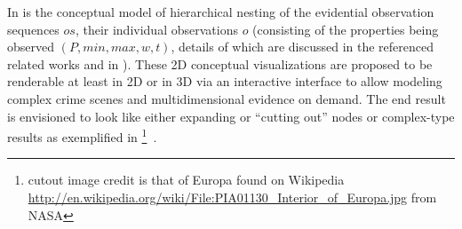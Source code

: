 
In  is the
conceptual model of hierarchical nesting of the evidential
observation sequences $os$, their individual observations $o$ (consisting
of the properties being observed $(P,min,max,w,t)$, details of which are discussed
in the referenced related works and in \cite[Chapter 7]{mokhov-phd-thesis-2013}).
%
These 2D conceptual visualizations are proposed
to be renderable at least in 2D or in 3D via an interactive interface to allow modeling complex
crime scenes and multidimensional evidence on demand. The end result is envisioned to look like
either expanding or ``cutting out'' nodes or complex-type results as
exemplified in \footnote{cutout image credit is that of Europa found on Wikipedia
\url{http://en.wikipedia.org/wiki/File:PIA01130_Interior_of_Europa.jpg} from NASA}~\cite{flucid-dfg-viz-pst2011}.


